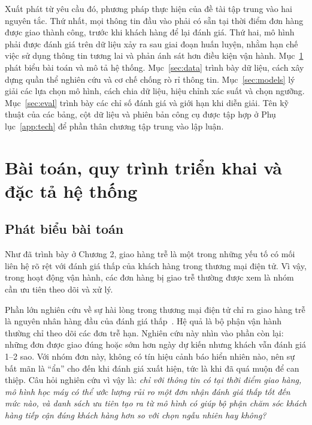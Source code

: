 \documentclass[12pt,a4paper]{report}
\begin{document}
Xuất phát từ yêu cầu đó, phương pháp thực hiện của đề tài tập trung vào hai nguyên tắc. Thứ nhất, mọi thông tin đầu vào phải có sẵn tại thời điểm đơn hàng được giao thành công, trước khi khách hàng để lại đánh giá. Thứ hai, mô hình phải được đánh giá trên dữ liệu xảy ra sau giai đoạn huấn luyện, nhằm hạn chế việc sử dụng thông tin tương lai và phản ánh sát hơn điều kiện vận hành. Mục~\ref{sec:pipeline} phát biểu bài toán và mô tả hệ thống. Mục~\ref{sec:data} trình bày dữ liệu, cách xây dựng quần thể nghiên cứu và cơ chế chống rò rỉ thông tin. Mục~\ref{sec:models} lý giải các lựa chọn mô hình, cách chia dữ liệu, hiệu chỉnh xác suất và chọn ngưỡng. Mục~\ref{sec:eval} trình bày các chỉ số đánh giá và giới hạn khi diễn giải. Tên kỹ thuật của các bảng, cột dữ liệu và phiên bản công cụ được tập hợp ở Phụ lục~\ref{app:tech} để phần thân chương tập trung vào lập luận.

\section{Bài toán, quy trình triển khai và đặc tả hệ thống}\label{sec:pipeline}

\subsection{Phát biểu bài toán}

Như đã trình bày ở Chương 2, giao hàng trễ là một trong những yếu tố có mối liên hệ rõ rệt với đánh giá thấp của khách hàng trong thương mại điện tử. Vì vậy, trong hoạt động vận hành, các đơn hàng bị giao trễ thường được xem là nhóm cần ưu tiên theo dõi và xử lý.

Phần lớn nghiên cứu về sự hài lòng trong thương mại điện tử chỉ ra giao hàng trễ là nguyên nhân hàng đầu của đánh giá thấp~\cite{ravula2023,deshpande2023}. Hệ quả là bộ phận vận hành thường chỉ theo dõi các đơn trễ hạn. Nghiên cứu này nhìn vào phần còn lại: những đơn được giao đúng hoặc sớm hơn ngày dự kiến nhưng khách vẫn đánh giá 1--2 sao. Với nhóm đơn này, không có tín hiệu cảnh báo hiển nhiên nào, nên sự bất mãn là ``ẩn'' cho đến khi đánh giá xuất hiện, tức là khi đã quá muộn để can thiệp. Câu hỏi nghiên cứu vì vậy là: \emph{chỉ với thông tin có tại thời điểm giao hàng, mô hình học máy có thể ước lượng rủi ro một đơn nhận đánh giá thấp tốt đến mức nào, và danh sách ưu tiên tạo ra từ mô hình có giúp bộ phận chăm sóc khách hàng tiếp cận đúng khách hàng hơn so với chọn ngẫu nhiên hay không?}
\end{document}
